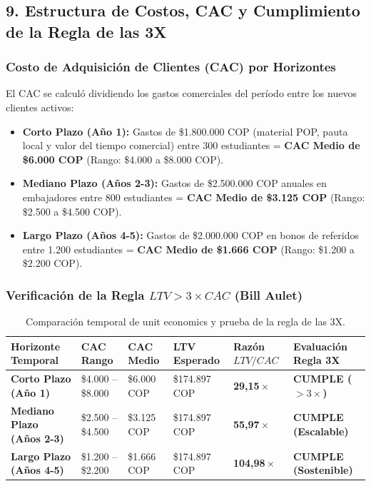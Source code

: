 \documentclass[11pt,a4paper]{article}
\begin{document}
\subsection{9. Estructura de Costos, CAC y Cumplimiento de la Regla de las 3X}

\subsubsection{Costo de Adquisici\'on de Clientes (CAC) por Horizontes}
El CAC se calcul\'o dividiendo los gastos comerciales del per\'iodo entre los nuevos clientes activos:
\begin{itemize}[leftmargin=*]
    \item \textbf{Corto Plazo (A\~no 1):} Gastos de \$1.800.000 COP (material POP, pauta local y valor del tiempo comercial) entre 300 estudiantes = \textbf{CAC Medio de \$6.000 COP} (Rango: \$4.000 a \$8.000 COP).
    \item \textbf{Mediano Plazo (A\~nos 2-3):} Gastos de \$2.500.000 COP anuales en embajadores entre 800 estudiantes = \textbf{CAC Medio de \$3.125 COP} (Rango: \$2.500 a \$4.500 COP).
    \item \textbf{Largo Plazo (A\~nos 4-5):} Gastos de \$2.000.000 COP en bonos de referidos entre 1.200 estudiantes = \textbf{CAC Medio de \$1.666 COP} (Rango: \$1.200 a \$2.200 COP).
\end{itemize}

\subsubsection{Verificaci\'on de la Regla $LTV > 3 \times CAC$ (Bill Aulet)}

\begin{table}[h!]
\centering
\small
\setlength{\tabcolsep}{4pt}
\renewcommand{\arraystretch}{1.3}
\begin{tabularx}{\textwidth}{>{\raggedright\arraybackslash\bfseries}X >{\centering\arraybackslash}p{2.3cm} >{\centering\arraybackslash}p{2.0cm} >{\centering\arraybackslash}p{2.3cm} >{\centering\arraybackslash}p{2.0cm} >{\centering\arraybackslash}p{3.0cm}}
\toprule
\textbf{Horizonte Temporal} & \textbf{CAC Rango} & \textbf{CAC Medio} & \textbf{LTV Esperado} & \textbf{Raz\'on $LTV/CAC$} & \textbf{Evaluaci\'on Regla 3X} \\
\midrule
Corto Plazo (A\~no 1) & \$4.000 -- \$8.000 & \$6.000 COP & \$174.897 COP & \textbf{29,15\,$\times$} & \textbf{\color{success}CUMPLE ($>3\times$)} \\
Mediano Plazo (A\~nos 2-3) & \$2.500 -- \$4.500 & \$3.125 COP & \$174.897 COP & \textbf{55,97\,$\times$} & \textbf{\color{success}CUMPLE (Escalable)} \\
Largo Plazo (A\~nos 4-5) & \$1.200 -- \$2.200 & \$1.666 COP & \$174.897 COP & \textbf{104,98\,$\times$} & \textbf{\color{success}CUMPLE (Sostenible)} \\
\bottomrule
\end{tabularx}
\caption{Comparaci\'on temporal de unit economics y prueba de la regla de las 3X.}
\label{tab:ltv_cac}
\end{table}
\end{document}
